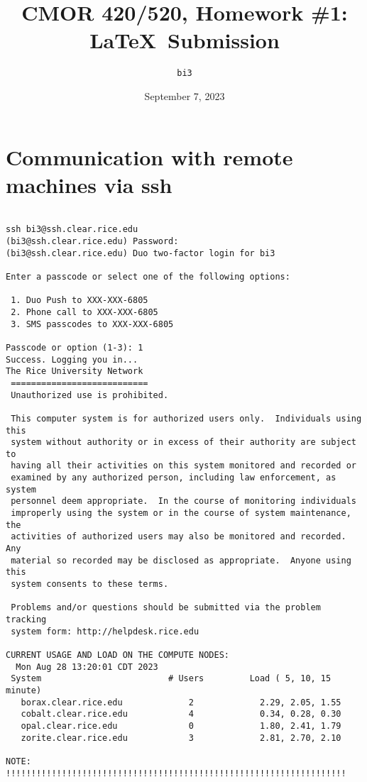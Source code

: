 \documentclass{article}
\begin{document}
\title{CMOR 420\slash520, Homework \#1: \LaTeX\ Submission}
\author{\texttt{bi3}}
\date{September 7, 2023}
\maketitle

\section{Communication with remote machines via ssh}

\begin{verbatim}

ssh bi3@ssh.clear.rice.edu
(bi3@ssh.clear.rice.edu) Password:
(bi3@ssh.clear.rice.edu) Duo two-factor login for bi3

Enter a passcode or select one of the following options:

 1. Duo Push to XXX-XXX-6805
 2. Phone call to XXX-XXX-6805
 3. SMS passcodes to XXX-XXX-6805

Passcode or option (1-3): 1
Success. Logging you in... 
The Rice University Network
 ===========================
 Unauthorized use is prohibited.

 This computer system is for authorized users only.  Individuals using this
 system without authority or in excess of their authority are subject to
 having all their activities on this system monitored and recorded or
 examined by any authorized person, including law enforcement, as system
 personnel deem appropriate.  In the course of monitoring individuals
 improperly using the system or in the course of system maintenance, the
 activities of authorized users may also be monitored and recorded.  Any
 material so recorded may be disclosed as appropriate.  Anyone using this
 system consents to these terms.

 Problems and/or questions should be submitted via the problem tracking
 system form: http://helpdesk.rice.edu

CURRENT USAGE AND LOAD ON THE COMPUTE NODES:
  Mon Aug 28 13:20:01 CDT 2023
 System                         # Users         Load ( 5, 10, 15 minute)
   borax.clear.rice.edu             2             2.29, 2.05, 1.55
   cobalt.clear.rice.edu            4             0.34, 0.28, 0.30
   opal.clear.rice.edu              0             1.80, 2.41, 1.79
   zorite.clear.rice.edu            3             2.81, 2.70, 2.10

NOTE: !!!!!!!!!!!!!!!!!!!!!!!!!!!!!!!!!!!!!!!!!!!!!!!!!!!!!!!!!!!!!!!!!!!


\end{verbatim}
\end{document}
